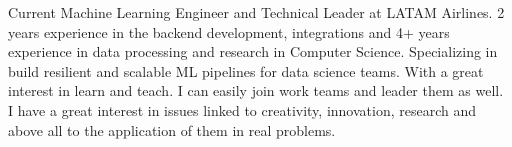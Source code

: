 

\begin{cvparagraph}

Current Machine Learning Engineer and Technical Leader at LATAM Airlines. 2 years experience in the backend development, integrations and 4+ years experience in data processing and research in Computer Science.
Specializing in build resilient and scalable ML pipelines for data science teams. With a great interest in learn and teach. I can easily join work teams and leader them as well. I have a great interest in issues linked to creativity, innovation, research and above all to the application of them in real problems.
\end{cvparagraph}
